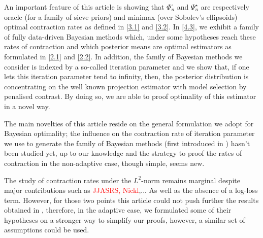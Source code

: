 An important feature of this article is showing that $\Phi_{n}^{\circ}$ and $\Psi_{n}^{\star}$ are respectively oracle (for a family of sieve priors) and minimax (over Sobolev's ellipsoids) optimal contraction rates as defined in \textsc{\cref{3.1}} and \textsc{\cref{3.2}}. In \textsc{\cref{4.3}}, we exhibit a family of fully data-driven Bayesian methods which, under some hypotheses reach these rates of contraction and which posterior means are optimal estimators as formulated in \textsc{\cref{2.1}} and \textsc{\cref{2.2}}.
In addition, the family of Bayesian methods we consider is indexed by a so-called iteration parameter and we show that, if one lets this iteration parameter tend to infinity, then, the posterior distribution is concentrating on the well known projection estimator with model selection by penalised contrast. By doing so, we are able to proof optimality of this estimator in a novel way.

\bigskip

The main novelties of this article reside on the general formulation we adopt for Bayesian optimality; the influence on the contraction rate of iteration parameter we use to generate the family of Bayesian methods (first introduced in \textsc{\citet{OBJJ}}) hasn't been studied yet, up to our knowledge and the strategy to proof the rates of contraction in the non-adaptive case, though simple, seems new.

The study of contraction rates under the $L^{2}$-norm remains marginal despite major contributions such as \textcolor{red}{JJASRS, Nickl},... As well as the absence of a log-loss term. However, for those two points this article could not push further the results obtained in \textsc{\citet{JJASRS}}, therefore, in the adaptive case, we formulated some of their hypotheses on a stronger way to simplify our proofs, however, a similar set of assumptions could be used.